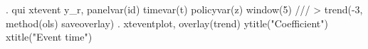 . qui xtevent y_r, panelvar(id) timevar(t) policyvar(z) window(5) ///
>         trend(-3, method(ols) saveoverlay)
{\smallskip}
. xteventplot, overlay(trend) ytitle("Coefficient") xtitle("Event time")
